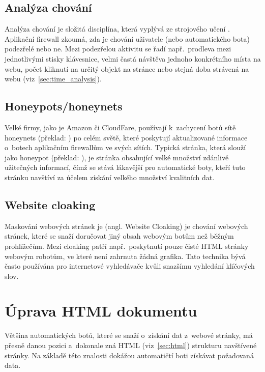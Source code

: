 \subsection*{Analýza chování}
Analýza chování je složitá disciplína, která vyplývá ze strojového učení \cite{bib:behaviorAnalysis}. Aplikační firewall zkoumá, zda je chování uživatele (nebo automatického bota) podezřelé nebo ne. Mezi podezřelou aktivitu se řadí např.~prodleva mezi jednotlivými stisky klávesnice, velmi častá návštěva jednoho konkrétního místa na webu, počet kliknutí na určitý objekt na stránce nebo stejná doba strávená na webu (viz~\ref{sec:time_analysis}). 

\subsection*{Honeypots/honeynets}
Velké firmy, jako je Amazon či CloudFare, používají k~zachycení botů sítě honeynets (překlad:  \textit{}) po celém světě, které poskytují aktualizované informace o~botech aplikačním firewallům ve svých sítích. Typická stránka, která slouží jako honeypot (překlad:  \textit{}), je stránka obsahující velké množství zdánlivě užitečných informací, čímž se stává lákavější pro automatické boty, kteří tuto stránku navštíví za účelem získání velkého množství kvalitních dat. 

\subsection*{Website cloaking}
Maskování webových stránek je (angl. Website Cloaking) je chování webových stránek, které se snaží doručovat jiný obsah webovým botům než běžným prohlížečům. Mezi cloaking patří např.~poskytnutí pouze čisté HTML stránky webovým robotům, ve které není zahrnuta žádná grafika. Tato technika bývá často používána pro internetové vyhledávače kvůli snazšímu vyhledání klíčových slov.

\section{Úprava HTML dokumentu}
Většina automatických botů, které se snaží o~získání dat z~webové stránky, má přesně danou pozici a~dokonale zná HTML (viz~\ref{sec:html}) strukturu navštívené stránky. Na základě této znalosti dokážou automatičtí boti získávat požadovaná data. 

